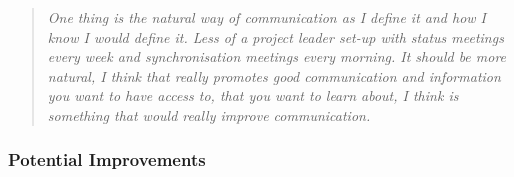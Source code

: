 \begin{description}
   \begin{quote}\itshape One thing is the natural way of communication as I define it and how I know I would define it. Less of a project leader set-up with status meetings every week and synchronisation meetings every morning. It should be more natural, I think that really promotes good communication and information you want to have access to, that you want to learn about, I think is something that would really improve communication.
   \end{quote}

\end{description}

\subsubsection{Potential Improvements}


